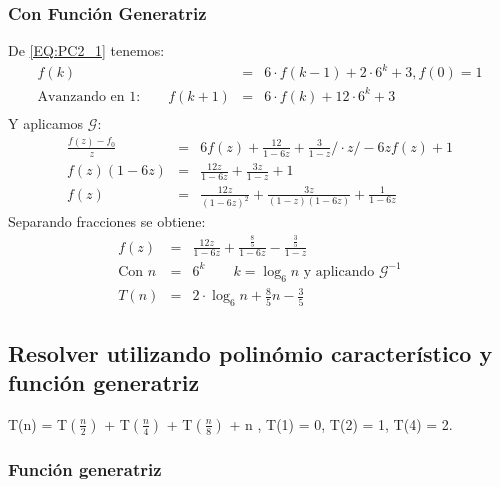 	\subsubsection{Con Función Generatriz}
		De \ref{EQ:PC2_1} tenemos:
		\begin{eqnarray*}
			f(k) &=& 6 \cdot f(k-1) + 2 \cdot 6^{k} + 3, f(0) = 1\\
			\text{Avanzando en 1:} \qquad f(k+1) &=& 6 \cdot f(k) + 12 \cdot 6^{k} + 3\\
		\end{eqnarray*}
		Y aplicamos $\mathcal{G}$:
		\begin{eqnarray*}
			\frac{f(z) - f_0}{z} &=& 6f(z) + \frac{12}{1-6z} + \frac{3}{1-z} / \cdot z / -6zf(z) +1 \\
			f(z)(1-6z) &=& \frac{12z}{1-6z} + \frac{3z}{1-z} + 1 \\
			f(z) &=& \frac{12z}{(1-6z)^2} + \frac{3z}{(1-z)(1-6z)} + \frac{1}{1-6z}
		\end{eqnarray*}
		Separando fracciones se obtiene:
		\begin{eqnarray*}
			f(z) &=& \frac{12z}{1-6z} + \frac{\frac{8}{5}}{1-6z} -  \frac{\frac{3}{5}}{1-z}\\
			\text{Con } n &=& 6^{k} \qquad k = \log_6 n \text{ y aplicando } \mathcal{G}^{-1}\\
			T(n) &=& 2 \cdot \log_6 n  + \frac{8}{5} n - \frac{3}{5}
		\end{eqnarray*}

\subsection{Resolver utilizando polinómio característico y función generatriz}
	\begin{center}
		T(n) = T$\left(\frac{n}{2}\right)$ + T$\left(\frac{n}{4}\right)$ + T$\left(\frac{n}{8}\right)$ + n , T(1) = 0, T(2) = 1, T(4) = 2.
	\end{center}
	
	\subsubsection{Función generatriz}
	
